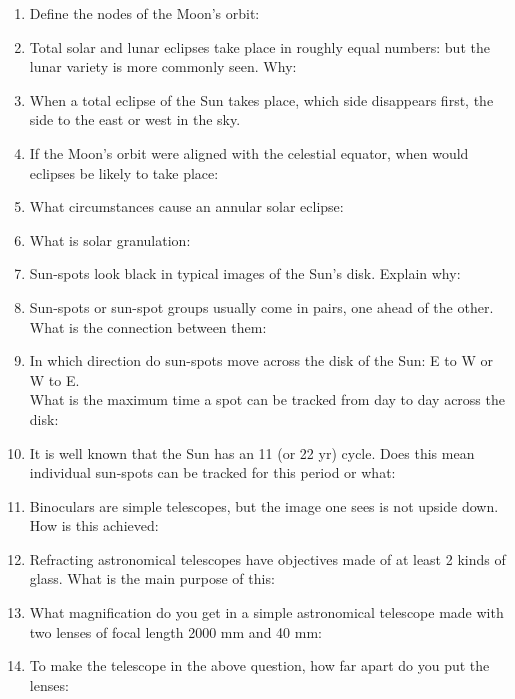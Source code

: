 \documentclass[11pt]{article}
\begin{document}
 
\bigskip
\begin{enumerate} 

\item Define the nodes of the Moon's orbit:

\item Total solar and lunar eclipses take place in roughly equal
numbers: but the lunar variety is more commonly seen. Why:

\item When a total eclipse of the Sun takes place, which side
disappears first, the side to the east or west in the sky.

\item
If the Moon's orbit were aligned with the celestial equator, when
would eclipses be likely to take place:

\item 
What circumstances cause an annular solar eclipse:

\item
What is solar granulation:

\item 
Sun-spots look black in typical images of the Sun's disk. Explain why:

\item 
Sun-spots or sun-spot groups usually come in pairs, one ahead of
  the other. What is the connection between them:

\item 
In which direction do sun-spots move across the disk of the Sun: E to W
or W to E. \\
What is the maximum time a spot can be tracked from day to day across
the disk:


\item 
It is well known that the Sun has an 11 (or 22 yr) cycle. Does this mean
individual sun-spots can be tracked for this period or what:

\item 
Binoculars are simple telescopes, but the image one sees is not upside
down. How is this achieved:

\item 
Refracting astronomical telescopes have objectives made of at least 2
kinds of glass. What is the main purpose of this:

\item 
What magnification do you get in a simple astronomical telescope made
with two lenses of focal length 2000 mm and 40 mm:

\item 
To make the telescope in the above question, how far apart do you put
the lenses:


\end{enumerate}
\end{document}
